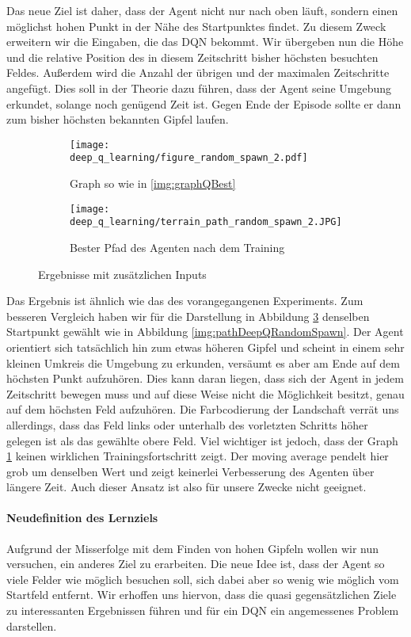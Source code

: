 Das neue Ziel ist daher, dass der Agent nicht nur nach oben läuft, sondern einen möglichst hohen Punkt in der Nähe des Startpunktes findet. Zu diesem Zweck erweitern wir die Eingaben, die das DQN bekommt. Wir übergeben nun die Höhe und die relative Position des in diesem Zeitschritt bisher höchsten besuchten Feldes. Außerdem wird die Anzahl der übrigen und der maximalen Zeitschritte angefügt. Dies soll in der Theorie dazu führen, dass der Agent seine Umgebung erkundet, solange noch genügend Zeit ist. Gegen Ende der Episode sollte er dann zum bisher höchsten bekannten Gipfel laufen.
\begin{figure}[h!]
    \centering
    \begin{subfigure}[b]{0.49\textwidth}
        \texttt{[image: deep\_q\_learning/figure\_random\_spawn\_2.pdf]}
        \caption{Graph so wie in \ref{img:graphQBest}}
        \label{img:graphDeepQRandomSpawn2}
    \end{subfigure}
    \begin{subfigure}[b]{0.49\textwidth}
        \texttt{[image: deep\_q\_learning/terrain\_path\_random\_spawn\_2.JPG]}
        \caption{Bester Pfad des Agenten nach dem Training}
        \label{img:pathDeepQRandomSpawn2}
    \end{subfigure}
    \caption{Ergebnisse mit zusätzlichen Inputs}
\end{figure}
Das Ergebnis ist ähnlich wie das des vorangegangenen Experiments. Zum besseren Vergleich haben wir für die Darstellung in Abbildung \ref{img:pathDeepQRandomSpawn2} denselben Startpunkt gewählt wie in Abbildung \ref{img:pathDeepQRandomSpawn}. Der Agent orientiert sich tatsächlich hin zum etwas höheren Gipfel und scheint in einem sehr kleinen Umkreis die Umgebung zu erkunden, versäumt es aber am Ende auf dem höchsten Punkt aufzuhören. Dies kann  daran liegen, dass sich der Agent in jedem Zeitschritt bewegen muss und auf diese Weise nicht die Möglichkeit besitzt, genau auf dem höchsten Feld aufzuhören. Die Farbcodierung der Landschaft verrät uns allerdings, dass das Feld links oder unterhalb des vorletzten Schritts höher gelegen ist als das gewählte obere Feld. Viel wichtiger ist jedoch, dass der Graph \ref{img:graphDeepQRandomSpawn2} keinen wirklichen Trainingsfortschritt zeigt. Der moving average pendelt hier grob um denselben Wert und zeigt keinerlei Verbesserung des Agenten über längere Zeit. Auch dieser Ansatz ist also für unsere Zwecke nicht geeignet.

\paragraph{Neudefinition des Lernziels}
Aufgrund der Misserfolge mit dem Finden von hohen Gipfeln wollen wir nun versuchen, ein anderes Ziel zu erarbeiten. Die neue Idee ist, dass der Agent so viele Felder wie möglich besuchen soll, sich dabei aber so wenig wie möglich vom Startfeld entfernt. Wir erhoffen uns hiervon, dass die quasi gegensätzlichen Ziele zu interessanten Ergebnissen führen und für ein DQN ein angemessenes Problem darstellen.

